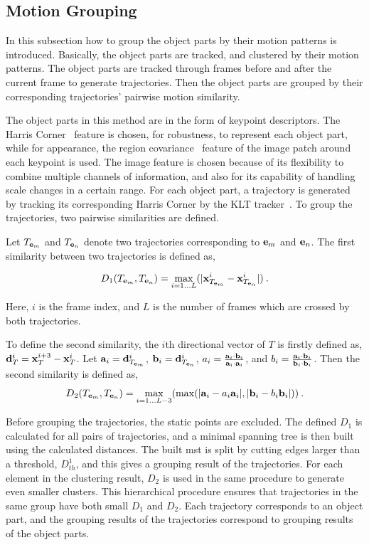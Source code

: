 \subsection{Motion Grouping}
In this subsection how to group the object parts by their motion patterns is introduced. Basically, the object parts are tracked, and clustered by their motion patterns. The object parts are tracked through frames before and after the current frame to generate trajectories. Then the object parts are grouped by their corresponding trajectories' pairwise motion similarity.

The object parts in this method are in the form of keypoint descriptors. The Harris Corner~\cite{harris} feature is chosen, for robustness, to represent each object part, while for appearance, the region covariance~\cite{regionc} feature of the image patch around each keypoint is used. The image feature is chosen because of its flexibility to combine multiple channels of information, and also for its capability of handling scale changes in a certain range.
For each object part, a trajectory is generated by tracking its corresponding Harris Corner by the KLT tracker~\cite{ij2}. To group the trajectories, two pairwise similarities are defined.

Let $T_{{\bf{e}}_m}$ and $T_{{\bf{e}}_n}$ denote two trajectories corresponding to ${{\bf{e}}_m}$ and ${{\bf{e}}_n}$. The first similarity between two trajectories is defined as,

\[
 {D_1}(T_{{\bf{e}}_m},T_{{\bf{e}}_n}) = \mathop {\max }\limits_{i=1...L} (|{\bf{x}}^i_{T_{{\bf{e}}_m}}-{\bf{x}}^i_{T_{{\bf{e}}_n}}|)\:.
\]

Here,  $i$ is the frame index, and $L$ is  the number of frames which are crossed by both trajectories.

To define the second similarity, the $i$th directional vector of $T$ is firstly defined as, ${\bf{d}}^i_T={\bf{x}}^{i+3}_{T}-{\bf{x}}^i_{T}$. Let ${\bf{a}}_i={\bf{d}}^i_{T_{{\bf{e}}_m}}$, ${\bf{b}}_i={\bf{d}}^i_{T_{{\bf{e}}_n}}$, $a_i=\frac{{{{\bf{a}}_i}\cdot{{\bf{b}}_i}}}{{{{\bf{a}}_i}\cdot{{\bf{a}}_i}}}$, and $b_i=\frac{{{{\bf{a}}_i}\cdot{{\bf{b}}_i}}}{{{{\bf{b}}_i}\cdot{{\bf{b}}_i}}}$. Then the second similarity is defined as,
\[
{D_2}(T_{{\bf{e}}_m},T_{{\bf{e}}_n})= \mathop {\max }\limits_{i=1...L-3} (\max (|{{\bf{a}}_i} - a_i {{\bf{a}}_i}|,|{{\bf{b}}_i} - b_i{{\bf{b}}_i}|))\:.
\]

Before grouping the trajectories, the static points are excluded. The defined $D_1$ is calculated for all pairs of trajectories, and a minimal spanning tree is then built using the calculated distances. The built mst is split by cutting edges larger than a threshold, $D^1_{th}$, and this gives a grouping result of the trajectories. For each element in the clustering result, $D_2$  is used in the same procedure to generate even smaller clusters. This hierarchical procedure ensures that trajectories in the same group have both small $D_1$ and $D_2$. Each trajectory corresponds to an object part, and the grouping results of the trajectories correspond to grouping results of the object parts.
